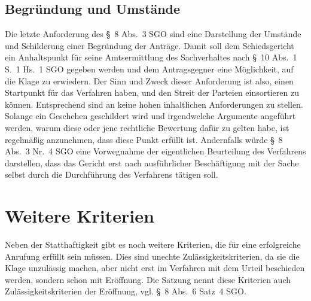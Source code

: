 \subsection{Begründung und Umstände}
\label{Standardworkflow:Gruende}
Die letzte Anforderung des \S~8 Abs.~3 SGO sind eine Darstellung der Umstände und Schilderung einer Begründung der Anträge.
Damit soll dem Schiedsgericht ein Anhaltspunkt für seine Amtsermittlung des Sachverhaltes nach \S~10 Abs.~1 S.~1 Hs.~1 SGO gegeben werden und dem Antragsgegner eine Möglichkeit, auf die Klage zu erwiedern.
Der Sinn und Zweck dieser Anforderung ist also, einen Startpunkt für das Verfahren haben, und den Streit der Parteien einsortieren zu können.
Entsprechend sind an keine hohen inhaltlichen Anforderungen zu stellen.
Solange ein Geschehen geschildert wird und irgendwelche Argumente angeführt werden, warum diese oder jene rechtliche Bewertung dafür zu gelten habe, ist regelmäßig anzunehmen, dass diese Punkt erfüllt ist.
Andernfalls würde \S~8 Abs.~3 Nr.~4 SGO eine Vorwegnahme der eigentlichen Beurteilung des Verfahrens darstellen, dass das Gericht erst nach ausführlicher Beschäftigung mit der Sache selbst durch die Durchführung des Verfahrens tätigen soll.

\section{Weitere Kriterien}
\label{Standardworkflow:Kriterien}
Neben der Statthaftigkeit gibt es noch weitere Kriterien, die für eine erfolgreiche Anrufung erfüllt sein müssen.
Dies sind unechte Zulässigkeitskriterien, da sie die Klage unzulässig machen, aber nicht erst im Verfahren mit dem Urteil beschieden werden, sondern schon mit Eröffnung.
Die Satzung nennt diese Kriterien auch Zulässigkeitskriterien der Eröffnung, vgl. \S~8 Abs.~6 Satz~4 SGO.

